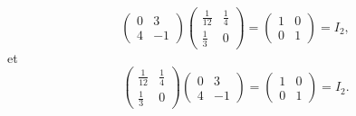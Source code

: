 {\begin{enumerate}
			\[ \begin{pmatrix} 0 & 3 \\ 4 & -1 \end{pmatrix}\begin{pmatrix} \frac1{12} & \frac14 \\ \frac13 & 0 \end{pmatrix} = \begin{pmatrix} 1&0\\0&1 \end{pmatrix} = I_2, \]
		et 
			\[\begin{pmatrix} \frac1{12} & \frac14 \\ \frac13 & 0 \end{pmatrix} \begin{pmatrix} 0 & 3 \\ 4 & -1 \end{pmatrix} = \begin{pmatrix} 1&0\\0&1 \end{pmatrix} = I_2. \]
	\end{enumerate}
}


